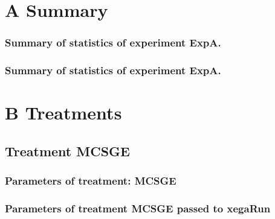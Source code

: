 \documentclass[18pt,c]{beamer}
\makeatletter
\def\beamer@writeslidentry@miniframesoff{%
  \expandafter\beamer@ifempty\expandafter{\beamer@framestartpage}{}%
  {%
   \clearpage\beamer@notesactions%
  }
}
\newcommand*{\miniframesoff}{\let\beamer@writeslidentry=\beamer@writeslidentry@miniframesoff}
\makeatother
\begin{document}
\section{A Summary}
 \begin{frame}
 \fontsize{8pt}{9pt}\selectfont
 \frametitle{ Summary of statistics of experiment ExpA. }

 \label{ExpAStatsTable013.tex}  
 \end{frame}

 \begin{frame}
 \fontsize{8pt}{9pt}\selectfont
 \frametitle{ Summary of statistics of experiment ExpA. }

 \label{ExpAStatsTable014.tex}  
 \end{frame}

\miniframesoff
\section{B Treatments}
\miniframesoff
\subsection{Treatment MCSGE}

 \begin{frame}
 \fontsize{8pt}{9pt}\selectfont
 \frametitle{  Parameters of treatment: MCSGE 
 }

 \label{ExpAtParmTable000.tex}  
 \end{frame}


 \begin{frame}
 \fontsize{8pt}{9pt}\selectfont
 \frametitle{  Parameters of treatment MCSGE passed to xegaRun
 }

 \label{ExpAtParmTable001.tex}  
 \end{frame}

\end{document}
